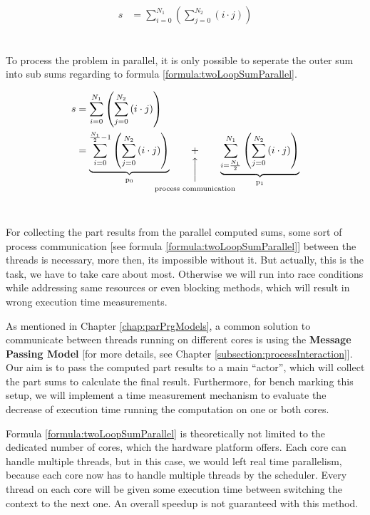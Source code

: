 \begin{align} \label{formula:twoLoopSum}
	\begin{aligned}
	s &= \sum_{i = 0}^{N_1} \left( \sum_{j = 0}^{N_2} \left(i \cdot j\right) \right)
	\end{aligned}
\end{align}
\

To process the problem in parallel, it is only possible to seperate the outer sum into sub sums regarding to formula \ref{formula:twoLoopSumParallel}.

\begin{align} \label{formula:twoLoopSumParallel}
	\begin{aligned}
	s &= \sum_{i = 0}^{N_1} \left( \sum_{j = 0}^{N_2} \left(i \cdot j\right) \right)
	\\ &=  \underbrace{ 
			\sum_{i = 0}^{\frac{N_1}{2} - 1} \left( \sum_{j = 0}^{N_2} \left(i \cdot j\right) \right)
 		}_\text{p\textsubscript{0}} \qquad \vertarrowbox{+}{process communication} \qquad \underbrace{  
 			\sum_{i = \frac{N_1}{2}}^{N_1} \left( \sum_{j = 0}^{N_2} \left(i \cdot j\right) \right)
		}_\text{p\textsubscript{1}}
	\end{aligned}
\end{align}
\

For collecting the part results from the parallel computed sums, some sort of process communication [see formula \ref{formula:twoLoopSumParallel}] between the threads is necessary, more then, its impossible without it. But actually, this is the task, we have to take care about most. Otherwise we will run into race conditions while addressing same resources or even blocking methods, which will result in wrong execution time measurements.

As mentioned in Chapter \ref{chap:parPrgModels}, a common solution to communicate between threads running on different cores is using the \textbf{Message Passing Model} [for more details, see Chapter \ref{subsection:processInteraction}]. Our aim is to pass the computed part results to a main ``actor'', which will collect the part sums to calculate the final result. Furthermore, for bench marking this setup, we will implement a time measurement mechanism to evaluate the decrease of execution time running the computation on one or both cores. 

Formula \ref{formula:twoLoopSumParallel} is theoretically not limited to the dedicated number of cores, which the hardware platform offers. Each core can handle multiple threads, but in this case, we would left real time parallelism, because each core now has to handle multiple threads by the scheduler. Every thread on each core will be given some execution time between switching the context to the next one. An overall speedup is not guaranteed with this method.   

